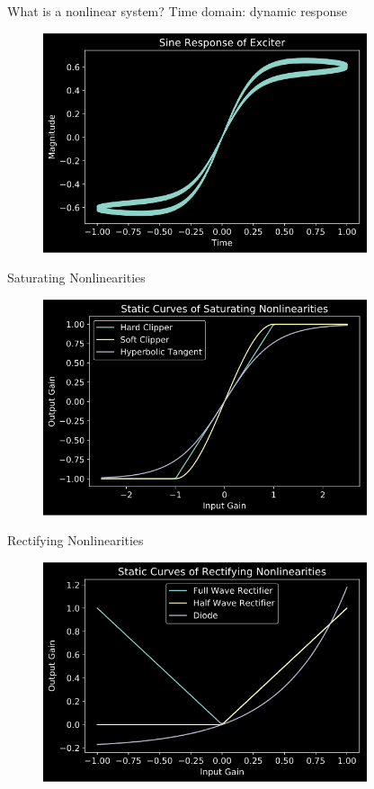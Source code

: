 \begin{frame}{What is a nonlinear system?}
    Time domain: dynamic response
    \begin{figure}
        \includegraphics[width=3.75in]{../Exciter/Pics/exciter_static.png}
    \end{figure}
\end{frame}

\begin{frame}{Saturating Nonlinearities}
    \begin{figure}
        \includegraphics[width=3.75in]{../Exciter/Pics/saturating_static.png}
    \end{figure}
\end{frame}

\begin{frame}{Rectifying Nonlinearities}
    \begin{figure}
        \includegraphics[width=3.75in]{../Exciter/Pics/rect_static.png}
    \end{figure}
\end{frame}


